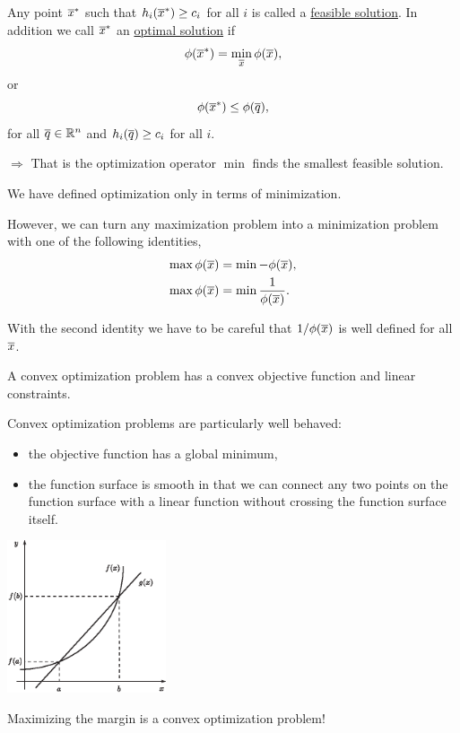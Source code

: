 \documentclass[a4paper,blends,pdf,colorBG,slideColor]{prosper}
\begin{document}
\es


Any point $\overline{x}^*$ such that $h_i(\overline{x}^*) \ge c_i$ for all $i$ is called a \ul{feasible solution}.
In addition we call $\overline{x}^*$ an \ul{optimal solution} if
\begin{equation*}
\phi(\overline{x}^*) = \min_{\overline{x}} \phi(\overline{x}), 
\end{equation*}
or
\begin{equation*}
\phi(\overline{x}^*) \le \phi(\overline{q}),
\end{equation*}
for all $\overline{q}\in \mathbb{R}^{n}$ and $h_i(\overline{q}) \ge c_i$ for all $i$.

$\Rightarrow$ That is the optimization operator $\min$ finds the smallest feasible solution.
\es

We have defined optimization only in terms of minimization.

However, we can turn any maximization problem into a minimization problem with one of the following identities,
\begin{align*}
\max \phi(\overline{x}) &= \min -\phi(\overline{x}),\\ 
 \max \phi(\overline{x}) &= \min \frac{1}{\phi(\overline{x})}.
 \end{align*}

With the second identity we have to be careful that ${1}/{\phi(\overline{x})}$ is well defined for
all $\overline{x}$.
\es


A convex optimization problem has a convex objective function and linear constraints. 

Convex optimization 
problems are particularly well behaved:
\begin{itemize}
\item the objective function has a global minimum,
\item the function surface is smooth in that we
can connect any two points on the function surface with a linear function without
crossing the function surface itself.
\end{itemize}

\begin{minipage}{2in}
\includegraphics[height=45mm]{figures/fig06-01.eps}
\end{minipage}
\begin{minipage}{2in}
Maximizing the margin is a convex optimization problem!
\end{minipage}
\end{document}
